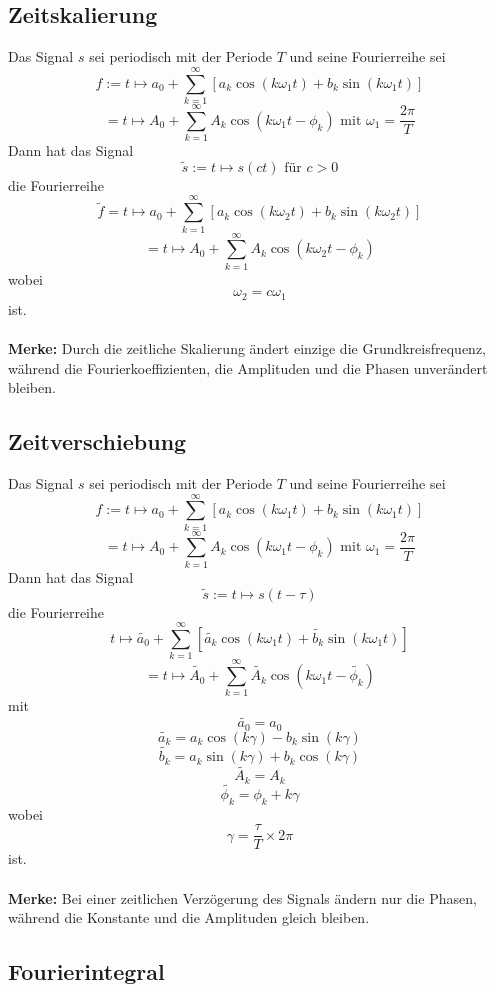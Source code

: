 \documentclass[10pt,a4paper]{scrartcl}
\begin{document}
\subsection{Zeitskalierung}

Das Signal $s$ sei periodisch mit der Periode $T$ und seine Fourierreihe sei
$$f:= t \mapsto a_0 + \sum_{k=1}^{\infty} \left[a_k\cos(k\omega_1t)
    + b_k\sin(k\omega_1t)\right]$$
$$= t \mapsto A_0 + \sum_{k=1}^{\infty} A_k \cos(k\omega_1t - \phi_k)
    \textrm{ mit } \omega_1 = \frac{2\pi}{T}$$
Dann hat das Signal
$$\tilde{s} := t \mapsto s(ct) \textrm{ für } c > 0$$
die Fourierreihe
$$\tilde{f} = t \mapsto a_0 + \sum_{k=1}^{\infty} \left[a_k \cos(k\omega_2t)
    + b_k\sin(k\omega_2t)\right]$$
$$= t \mapsto A_0 + \sum_{k=1}^{\infty} A_k\cos(k\omega_2t - \phi_k)$$
wobei
$$\omega_2 = c\omega_1$$
ist.\\\\
\textbf{Merke:} Durch die zeitliche Skalierung ändert einzige die
Grundkreisfrequenz, während die Fourierkoeffizienten, die Amplituden und die
Phasen unverändert bleiben.


\subsection{Zeitverschiebung}

Das Signal $s$ sei periodisch mit der Periode $T$ und seine Fourierreihe sei
$$f:= t \mapsto a_0 + \sum_{k=1}^{\infty} \left[a_k\cos(k\omega_1t)
    + b_k\sin(k\omega_1t)\right]$$
$$= t \mapsto A_0 + \sum_{k=1}^{\infty} A_k \cos(k\omega_1t - \phi_k)
    \textrm{ mit } \omega_1 = \frac{2\pi}{T}$$
Dann hat das Signal
$$\tilde{s} := t \mapsto s(t-\tau)$$
die Fourierreihe
$$t \mapsto \widetilde{a_0} + \sum_{k=1}^{\infty} \left[\widetilde{a_k}
    \cos(k\omega_1t) + \widetilde{b_k}\sin(k\omega_1t)\right]$$
$$= t \mapsto \widetilde{A_0} + \sum_{k=1}^{\infty}
    \widetilde{A_k}\cos(k\omega_1t - \widetilde{\phi_k})$$
mit
$$\widetilde{a_0} = a_0$$
$$\widetilde{a_k} = a_k\cos(k\gamma) - b_k\sin(k\gamma)$$
$$\widetilde{b_k} = a_k\sin(k\gamma) + b_k\cos(k\gamma)$$
$$\widetilde{A_k} = A_k$$
$$\widetilde{\phi_k} = \phi_k + k\gamma$$
wobei
$$\gamma = \frac{\tau}{T} \times 2\pi$$
ist.\\\\
\textbf{Merke:} Bei einer zeitlichen Verzögerung des Signals ändern nur die
Phasen, während die Konstante und die Amplituden gleich bleiben.


\subsection{Fourierintegral}
\end{document}
